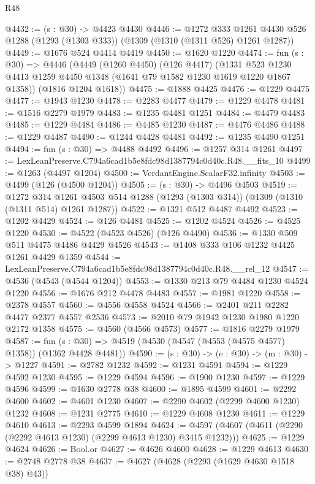 \begin{lexlean}{R48}
\begin{coremodule}
@4432 := (s : @30) -> @4423 @4430
@4446 := @1272
    @333
    @1261
    @4430
    @526
    @1288
    (@1293 (@1303 @333))
    (@1309 (@1310 (@1311 @526) @1261 @1287))
@4449 := @1676 @524 @4414 @4419
@4450 := @1620 @1220
@4474 := fun (s : @30) =>
  @4446
    (@4449
      (@1260 @4450)
      (@126 @4417)
      (@1331 @523 @1230 @4413 @1259 @4450 @1348 (@1641 @79 @1582 @1230 @1619 @1220 @1867 @1358))
      (@1816 @1204 @1618))
@4475 := @1888 @4425
@4476 := @1229 @4475
@4477 := @1943 @1230
@4478 := @2283 @4477
@4479 := @1229 @4478
@4481 := @1516 @2279 @1979
@4483 := @1235 @4481 @1251
@4484 := @4479 @4483
@4485 := @1229 @4484
@4486 := @4485 @1230
@4487 := @4476 @4486
@4488 := @1229 @4487
@4490 := @1244 @4428 @4481
@4492 := @1235 @4490 @1251
@4494 := fun (s : @30) => @4488 @4492
@4496 := @1257 @314 @1261
@4497 := LexLeanPreserve.C794a6cad1b5e8fdc98d1387794c0d40c.R48.__fits_10
@4499 := @1263 (@4497 @1204)
@4500 := VerdantEngine.ScalarF32.infinity
@4503 := @4499 (@126 (@4500 @1204))
@4505 := (s : @30) -> @4496 @4503
@4519 := @1272
    @314
    @1261
    @4503
    @514
    @1288
    (@1293 (@1303 @314))
    (@1309 (@1310 (@1311 @514) @1261 @1287))
@4522 := @1321 @512 @4487 @4492
@4523 := @1202 @4429
@4524 := @126 @4481
@4525 := @1202 @4524
@4526 := @4525 @1220
@4530 := @4522 (@4523 @4526) (@126 @4490)
@4536 := @1330 @509 @511 @4475 @4486 @4429 @4526
@4543 := @1408 @333 @106 @1232 @4425 @1261 @4429 @1359
@4544 := LexLeanPreserve.C794a6cad1b5e8fdc98d1387794c0d40c.R48.__rel_12
@4547 := @4536 (@4543 (@4544 @1204))
@4553 := @1330 @213 @79 @4484 @1230 @4524 @1220
@4556 := @1676 @212 @4478 @4483
@4557 := @1981 @1220
@4558 := @2378 @4557
@4560 := @4556 @4558 @4524
@4566 := @2401 @211 @2282 @4477 @2377 @4557 @2536
@4573 := @2010 @79 @1942 @1230 @1980 @1220 @2172 @1358
@4575 := @4560 (@4566 @4573)
@4577 := @1816 @2279 @1979
@4587 := fun (s : @30) => @4519 (@4530 (@4547 (@4553 (@4575 @4577) @1358)) (@1362 @4428 @4481))
@4590 := (s : @30) -> (e : @30) -> (m : @30) -> @1227
@4591 := @2782 @1232
@4592 := @1231 @4591
@4594 := @1229 @4592 @1230
@4595 := @1229 @4594
@4596 := @1900 @1230
@4597 := @1229 @4596
@4599 := @1630 @2778 @38
@4600 := @1895 @4599
@4601 := @2292 @4600
@4602 := @4601 @1230
@4607 := @2290 @4602 (@2299 @4600 @1230) @1232
@4608 := @1231 @2775
@4610 := @1229 @4608 @1230
@4611 := @1229 @4610
@4613 := @2293 @4599 @1894
@4624 := @4597 (@4607 (@4611 (@2290 (@2292 @4613 @1230) (@2299 @4613 @1230) @3415 @1232)))
@4625 := @1229 @4624
@4626 := Bool.or
@4627 := @4626 @4600
@4628 := @1229 @4613
@4630 := @2748 @2778 @38
@4637 := @4627 (@4628 (@2293 (@1629 @4630 @1518 @38) @43))

\end{coremodule}
\end{lexlean}
